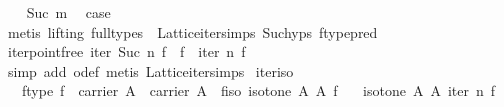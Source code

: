 \begin{isabellebody}
\ \ \isamarkupfalse%
\ {}Suc\ m{}\ \isamarkupfalse%
\ {}case\isanewline
\ \ \ \ \isamarkupfalse%
\ {}metis\ {}lifting{}\ full{}types{}\ {}{}{}\ Lattice{}iter{}simps{}{}{}\ Suc{}hyps\ ftype{}pred{}\isanewline
{}\isamarkupfalse%
%
\endisatagproof
{\isafoldproof}%
%
\isadelimproof
\isanewline
%
\endisadelimproof
\isanewline
{}\isamarkupfalse%
\ iter{}pointfree{}\ {}iter\ {}Suc\ n{}\ f\ {}\ f\ {}\ iter\ n\ f{}\isanewline
%
\isadelimproof
\ \ %
\endisadelimproof
%
\isatagproof
{}\isamarkupfalse%
\ {}simp\ add{}\ o{}def{}\ metis\ Lattice{}iter{}simps{}{}{}{}%
\endisatagproof
{\isafoldproof}%
%
\isadelimproof
\isanewline
%
\endisadelimproof
\isanewline
{}\isamarkupfalse%
\ iter{}iso{}\isanewline
\ \ \ f{}type{}\ {}f\ {}\ carrier\ A\ {}\ carrier\ A{}\ \ f{}iso{}\ {}isotone\ A\ A\ f{}\isanewline
\ \ \ {}isotone\ A\ A\ {}iter\ n\ f{}{}\isanewline

\end{isabellebody}
